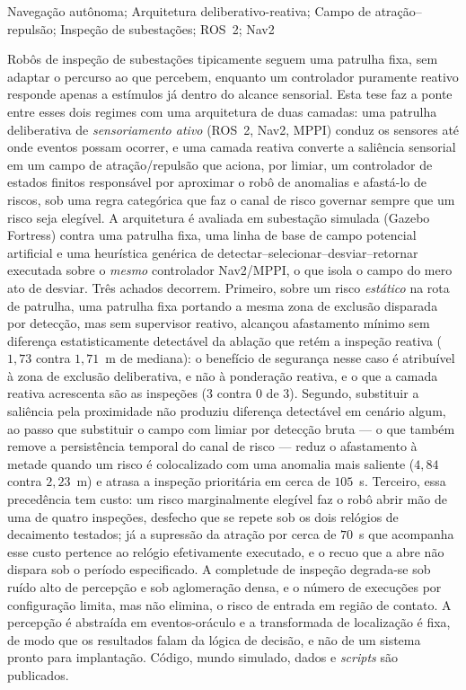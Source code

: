 \documentclass[tesedr]{ppgee}
\begin{document}
\begin{resumo}{Navegação autônoma; Arquitetura deliberativo-reativa; Campo de atração--repulsão; Inspeção de subestações; ROS~2; Nav2}

Robôs de inspeção de subestações tipicamente seguem uma patrulha fixa, sem adaptar o
percurso ao que percebem, enquanto um controlador puramente reativo responde apenas a
estímulos já dentro do alcance sensorial. Esta tese faz a ponte entre esses dois
regimes com uma arquitetura de duas camadas: uma patrulha deliberativa de
\emph{sensoriamento ativo} (ROS~2, Nav2, MPPI) conduz os sensores até onde eventos
possam ocorrer, e uma camada reativa converte a saliência sensorial em um campo de
atração/repulsão que aciona, por limiar, um controlador de estados finitos
responsável por aproximar o robô de anomalias e afastá-lo de riscos, sob uma regra
categórica que faz o canal de risco governar sempre que um risco seja elegível. A
arquitetura é avaliada em subestação simulada (Gazebo Fortress) contra uma patrulha
fixa, uma linha de base de campo potencial artificial e uma heurística genérica de
detectar--selecionar--desviar--retornar executada sobre o \emph{mesmo} controlador
Nav2/MPPI, o que isola o campo do mero ato de desviar. Três achados decorrem. Primeiro,
sobre um risco \emph{estático} na rota de patrulha, uma patrulha fixa portando a mesma
zona de exclusão disparada por detecção, mas sem supervisor reativo, alcançou
afastamento mínimo sem diferença estatisticamente detectável da ablação que retém a
inspeção reativa ($1{,}73$ contra $1{,}71$~m de mediana): o benefício de segurança
nesse caso é atribuível à zona de exclusão deliberativa, e não à ponderação reativa, e
o que a camada reativa acrescenta são as inspeções ($3$ contra $0$ de $3$). Segundo,
substituir a saliência pela proximidade não produziu diferença detectável em cenário
algum, ao passo que substituir o campo com limiar por detecção bruta --- o que também
remove a persistência temporal do canal de risco --- reduz o afastamento à metade
quando um risco é colocalizado com uma anomalia mais saliente ($4{,}84$ contra
$2{,}23$~m) e atrasa a inspeção prioritária em cerca de $105$~s. Terceiro, essa
precedência tem custo: um risco marginalmente elegível faz o robô abrir mão de uma de
quatro inspeções, desfecho que se repete sob os dois relógios de decaimento testados;
já a supressão da atração por cerca de $70$~s que acompanha esse custo pertence ao
relógio efetivamente executado, e o recuo que a abre não dispara sob o período
especificado. A completude de inspeção degrada-se sob
ruído alto de percepção e sob aglomeração densa, e o número de execuções por
configuração limita, mas não elimina, o risco de entrada em região de contato. A
percepção é abstraída em eventos-oráculo e a transformada de localização é fixa, de
modo que os resultados falam da lógica de decisão, e não de um sistema pronto para
implantação. Código, mundo simulado, dados e \textit{scripts} são publicados.

\end{resumo}
\end{document}
